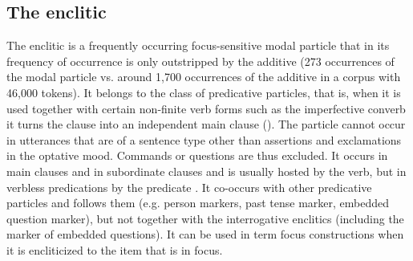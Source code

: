 
\subsection{The enclitic }
\label{ssec:The enclitic =q'al}

The enclitic  is a frequently occurring focus-sensitive modal particle that in its frequency of occurrence is only outstripped by the additive (273 occurrences of the modal particle vs. around 1,700 occurrences of the additive in a corpus with 46,000 tokens). It belongs to the class of predicative particles, that is, when it is used together with certain non-finite verb forms such as the imperfective converb it turns the clause into an independent main clause  (). The particle cannot occur in utterances that are of a sentence type other than assertions and exclamations in the optative mood. Commands or questions are thus excluded. It occurs in main clauses  and in subordinate clauses  and is usually hosted by the verb, but in verbless predications by the predicate . It co-occurs with other predicative particles and follows them (e.g. person markers, past tense marker, embedded question marker), but not together with the interrogative enclitics (including the marker of embedded questions). It can be used in term focus constructions when it is encliticized to the item that is in focus. 

